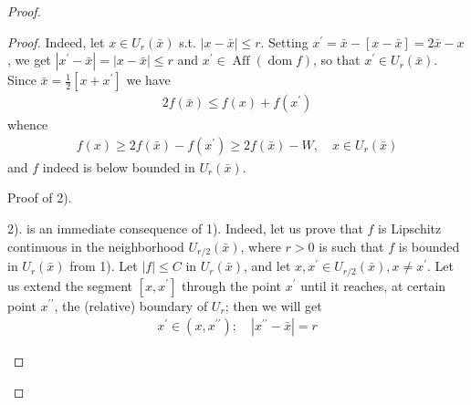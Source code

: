 \documentclass{article}
\newcommand{\Aff}{\operatorname{Aff}}
\newcommand{\dom}{\operatorname{dom}}
\begin{document}
\begin{proof}
\begin{proof}
 Indeed, let $x \in U_{r}(\bar{x})$ s.t. $|x-\bar{x}| \leq r$. Setting $x^{\prime}=\bar{x}-[x-\bar{x}]=2 \bar{x}-x$, we get  $\left|x^{\prime}-\bar{x}\right|=|x-\bar{x}| \leq r$ and $x^{\prime} \in\Aff(\dom f)$, so that $x^{\prime} \in U_{r}(\bar{x})$. Since $\bar{x}=\frac{1}{2}\left[x+x^{\prime}\right]$ we have
\begin{align*}
2 f(\bar{x}) \leq f(x)+f\left(x^{\prime}\right)
\end{align*}
whence
\begin{align*}
f(x) \geq 2 f(\bar{x})-f\left(x^{\prime}\right) \geq 2 f(\bar{x})-W, \quad x \in U_{r}(\bar{x})
\end{align*}
and $f$ indeed is below bounded in $U_{r}(\bar{x})$.


Proof of 2).

 2). is an immediate consequence of 1). Indeed, let us prove that $f$ is Lipschitz continuous in the neighborhood $U_{r / 2}(\bar{x})$, where $r>0$ is such that $f$ is bounded in $U_{r}(\bar{x})$ from 1). Let $|f| \leq C$ in  $U_{r}(\bar{x})$, and let $x, x^{\prime} \in U_{r / 2}(\bar{x}), x \neq x^{\prime} .$ Let us extend the segment $\left[x, x^{\prime}\right]$ through the point $x^{\prime}$ until it reaches, at certain point $x^{\prime \prime}$, the (relative) boundary of $U_{r}$; then we will get
 \begin{align*}
x^{\prime} \in\left(x, x^{\prime \prime}\right) ; \quad\left|x^{\prime \prime}-\bar{x}\right|=r
\end{align*}
 \begin{figure}[H]
\centering



\begin{tikzpicture}[x=0.75pt,y=0.75pt,yscale=-1,xscale=1]


\end{tikzpicture}
\end{figure}
\end{proof}
\end{proof}
\end{document}
